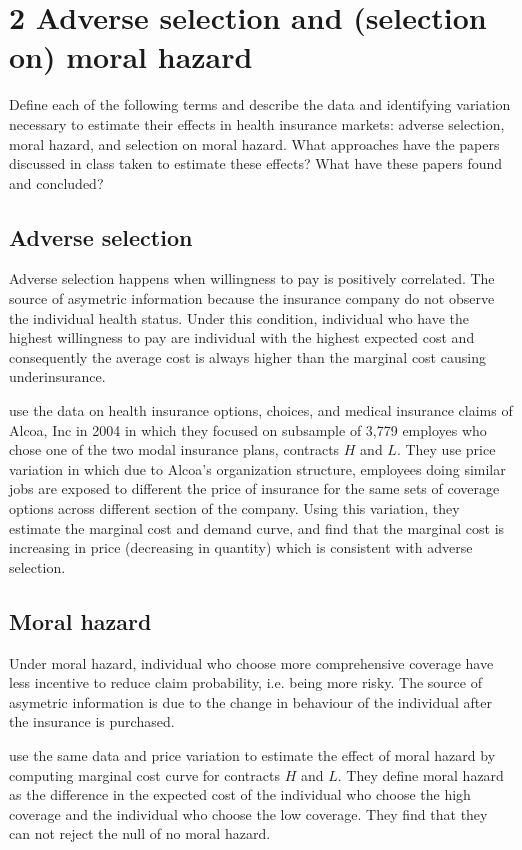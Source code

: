 \documentclass{article}
\begin{document}
\section*{2 Adverse selection and (selection on) moral hazard}

Define each of the following terms and describe the data and identifying variation necessary to estimate their effects in health insurance markets: adverse selection, moral hazard, and selection on moral hazard. What approaches have the papers discussed in class taken to estimate these effects? What have these papers found and concluded?

\subsection*{Adverse selection}
Adverse selection happens when willingness to pay is positively correlated. The source of asymetric information because the insurance company do not observe the individual health status. Under this condition, individual who have the highest willingness to pay are individual with the highest expected cost and consequently the average cost is always higher than the marginal cost causing underinsurance. 

\cite{einav2010estimating} use the data on health insurance options, choices, and medical insurance claims of Alcoa, Inc in 2004 in which they focused on subsample of 3,779 employes who chose one of the two modal insurance plans, contracts $H$ and $L$. They use price variation in which due to Alcoa's organization structure, employees doing similar jobs are exposed to different the price of insurance for the same sets of coverage options across different section of the company. Using this variation, they estimate the marginal cost and demand curve, and find that the marginal cost is increasing in price (decreasing in quantity) which is consistent with adverse selection.

\subsection*{Moral hazard}
Under moral hazard, individual who choose more comprehensive coverage have less incentive to reduce claim probability, i.e. being more risky. The source of asymetric information is due to the change in behaviour of the individual after the insurance is purchased. 

\cite{einav2010estimating} use the same data and price variation to estimate the effect of moral hazard by computing marginal cost curve for contracts $H$ and $L$. They define moral hazard as the difference in the expected cost of the individual who choose the high coverage and the individual who choose the low coverage. They find that they can not reject the null of no moral hazard.
\end{document}
